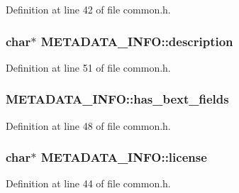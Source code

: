 Definition at line 42 of file common.\+h.

\subsubsection[{\texorpdfstring{description}{description}}]{ char$\ast$ M\+E\+T\+A\+D\+A\+T\+A\+\_\+\+I\+N\+F\+O\+::description}\hypertarget{struct_m_e_t_a_d_a_t_a___i_n_f_o_aa42bf600c20f3cc25fe8498238f58ca8}{}\label{struct_m_e_t_a_d_a_t_a___i_n_f_o_aa42bf600c20f3cc25fe8498238f58ca8}


Definition at line 51 of file common.\+h.

\subsubsection[{\texorpdfstring{has\+\_\+bext\+\_\+fields}{has_bext_fields}}]{ M\+E\+T\+A\+D\+A\+T\+A\+\_\+\+I\+N\+F\+O\+::has\+\_\+bext\+\_\+fields}\hypertarget{struct_m_e_t_a_d_a_t_a___i_n_f_o_ae2f9d679674fce7a81a66a98feb2836c}{}\label{struct_m_e_t_a_d_a_t_a___i_n_f_o_ae2f9d679674fce7a81a66a98feb2836c}


Definition at line 48 of file common.\+h.

\subsubsection[{\texorpdfstring{license}{license}}]{ char$\ast$ M\+E\+T\+A\+D\+A\+T\+A\+\_\+\+I\+N\+F\+O\+::license}\hypertarget{struct_m_e_t_a_d_a_t_a___i_n_f_o_ad7a818ae9c1a106f792ed3a837031ece}{}\label{struct_m_e_t_a_d_a_t_a___i_n_f_o_ad7a818ae9c1a106f792ed3a837031ece}


Definition at line 44 of file common.\+h.

